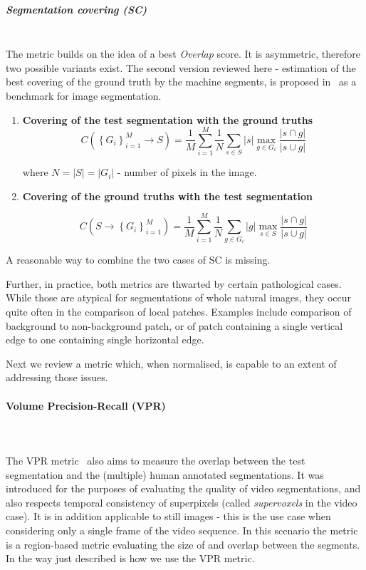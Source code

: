 \subparagraph{Segmentation covering (SC)}\mbox{}\\
The metric builds on the idea of a best \textit{Overlap} score. 
It is asymmetric, therefore two possible variants exist. The second version reviewed here - estimation of the best covering of the ground truth by the machine segments, is proposed in~\cite{Arbelaez09} as a benchmark for image segmentation.

\begin{enumerate}
\item{\textbf{Covering of the test segmentation with the ground truths}}
\[
C\left(\left\{ {G_{i}}\right\} _{i=1}^{M}\longrightarrow S\right)=\frac{1}{M}\sum\limits _{i=1}^{M}\frac{1}{N}\sum\limits _{s\in S}\left|s\right|\max_{g\in G_{i}}\frac{\left|s\cap g\right|}{\left|s\cup g\right|}
\]

where $N=\left|S\right|=\left|G_{i}\right|$ - number of pixels in the image.

\item{\textbf{Covering of the ground truths with the test segmentation}}

\[
C\left(S\longrightarrow\left\{ {G_{i}}\right\} _{i=1}^{M}\right)=\frac{1}{M}\sum\limits _{i=1}^{M}\frac{1}{N}\sum\limits _{g\in G_{i}}\left|g\right|\max_{s\in S}\frac{\left|s\cap g\right|}{\left|s\cup g\right|}
\]
\end{enumerate}
A reasonable %
way to combine the two cases of SC is missing.

Further, in practice, both metrics are thwarted by certain pathological cases. While those are atypical for segmentations of whole natural images, they occur quite often in the comparison of local patches. Examples include comparison of background to non-background patch, or of patch containing a single vertical edge to one containing single horizontal edge. 

Next we review a metric which, when normalised, is capable to an extent of addressing those issues.

\paragraph{Volume Precision-Recall (VPR)}\mbox{}\\\mbox{}\\
\label{par:ch4-VPR-maths}
The VPR metric~\cite{Galasso13} also aims to measure the overlap between the test segmentation and the (multiple) human annotated segmentations. It was introduced for the purposes of evaluating the quality of video segmentations, and also respects temporal consistency of superpixels (called \textit{supervoxels} in the video case). It is in addition applicable to %
still images - this is the use case when considering only a single frame of the video sequence. In this scenario the metric is a region-based metric evaluating the size of and overlap between the segments. 
In the way just described is how we use the VPR metric.

